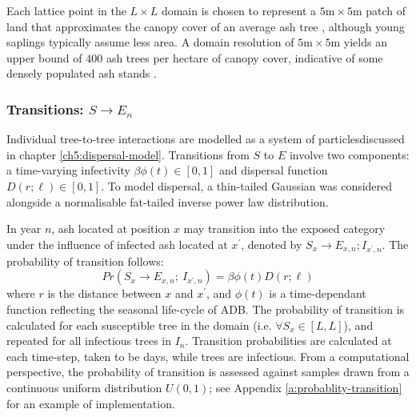 Each lattice point in the $L\times L$ domain is chosen to represent a $5\mathrm{m}\times5\mathrm{m}$ patch of land that approximates the canopy cover of an average ash tree
\textemdash, although young saplings typically assume less area. 
A domain resolution of $5\mathrm{m}\times5\mathrm{m}$ yields an upper bound of $400$ ash trees per hectare of canopy cover, indicative of some densely populated ash stands \cite{ash-tree2, ash-tree1}. %

\subsubsection{Transitions: $S\rightarrow E_n$}

Individual tree-to-tree interactions are modelled as a system of particles\textemdash discussed in chapter \ref{ch5:dispersal-model}.
Transitions from $S$ to $E$ involve two components: a time-varying infectivity $\beta\phi(t)\in [0, 1]$ and dispersal function $D(r; \ell)\in [0, 1]$.
To model dispersal, a thin-tailed Gaussian was considered alongside a normalisable fat-tailed inverse power law distribution.

In year $n$, ash located at position $x$ may transition into the exposed category under the influence of infected ash located at $x^\prime$, denoted by $S_x \rightarrow E_{x,n}; I_{x^\prime, n}$.
The probability of transition follows:
\begin{equation}
    Pr(S_{x} \rightarrow E_{x,n} ;\ I_{x^{\prime}, n} ) = \beta  \phi(t) D(r;\ell)
\end{equation}
where $r$ is the distance between $x$ and $x^{\prime}$, and $\phi(t)$ is a time-dependant function reflecting the seasonal life-cycle of ADB.
The probability of transition is calculated for each susceptible tree in the domain (i.e. $\forall S_x \in [L, L]$),
and repeated for all infectious trees in $I_n$.
Transition probabilities are calculated at each time-step, taken to be days, while trees are infectious.
From a computational perspective, the probability of transition is assessed against samples drawn from a continuous uniform distribution $U(0, 1)$;
see Appendix \ref{a:probablity-transition} for an example of implementation.


